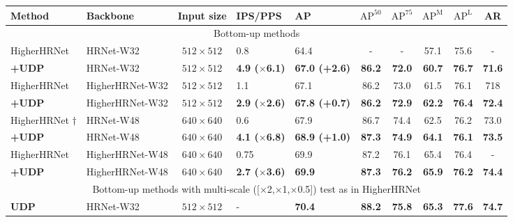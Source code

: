 \documentclass[10pt,journal,compsoc]{IEEEtran}
\begin{document}
\begin{table*}
\begin{center}
\begin{tabular}{l|l|c|l|lccccc}
\hline
Method                   & Backbone         &Input size    &IPS/PPS                     &AP                     & $\text{AP}^{50}$ & $\text{AP}^{75}$ & $\text{AP}^{\text{M}}$ &$\text{AP}^{\text{L}}$ &AR  \\
\hline
\multicolumn{10}{c}{Bottom-up methods}\\
\hline
HigherHRNet \cite{Higher}& HRNet-W32     &$512\times512$    &0.8                        &64.4                   & -             & -             & 57.1          &75.6           &-             \\
\textbf{+UDP}            & HRNet-W32     &$512\times512$    &\textbf{4.9 ($\times$6.1)} &\textbf{67.0 (+2.6)}   & \textbf{86.2} & \textbf{72.0} & \textbf{60.7} &\textbf{76.7}  &\textbf{71.6}          \\
HigherHRNet \cite{Higher}& HigherHRNet-W32&$512\times512$   &1.1                        &67.1                   & 86.2          & 73.0          & 61.5          &76.1           & 718            \\
\textbf{+UDP}            & HigherHRNet-W32&$512\times512$   &\textbf{2.9 ($\times$2.6)} &\textbf{67.8 (+0.7)}   & \textbf{86.2} & \textbf{72.9} & \textbf{62.2} &\textbf{76.4}  &\textbf{72.4}  \\
HigherHRNet \cite{Higher}$\dagger$&HRNet-W48&$640\times640$ &0.6                        &67.9                  & 86.7              & 74.4         & 62.5          &76.2           &73.0\\
\textbf{+UDP}            &HRNet-W48      &$640\times640$    &\textbf{4.1 ($\times$6.8)} &\textbf{68.9 (+1.0)}         & \textbf{87.3}     & \textbf{74.9}& \textbf{64.1} &\textbf{76.1}  &\textbf{73.5}\\
HigherHRNet \cite{Higher}& HigherHRNet-W48&$640\times640$   &0.75                       &69.9                   & 87.2          & 76.1          & 65.4          &76.4           & -     \\
\textbf{+UDP}            & HigherHRNet-W48&$640\times640$   &\textbf{2.7 ($\times$3.6)} &\textbf{69.9}          & \textbf{87.3} & \textbf{76.2} & \textbf{65.9} &\textbf{76.2}  &\textbf{74.4} \\
\hline
\multicolumn{10}{c}{Bottom-up methods with multi-scale ([$\times$2,$\times$1,$\times$0.5]) test as in HigherHRNet \cite{Higher}}\\
\hline
\textbf{UDP}             & HRNet-W32      &$512\times512$   &-&\textbf{70.4}        & \textbf{88.2} & \textbf{75.8} & \textbf{65.3} &\textbf{77.6}  &\textbf{74.7} \\

\end{tabular}
\end{center}
\end{table*}
\end{document}
